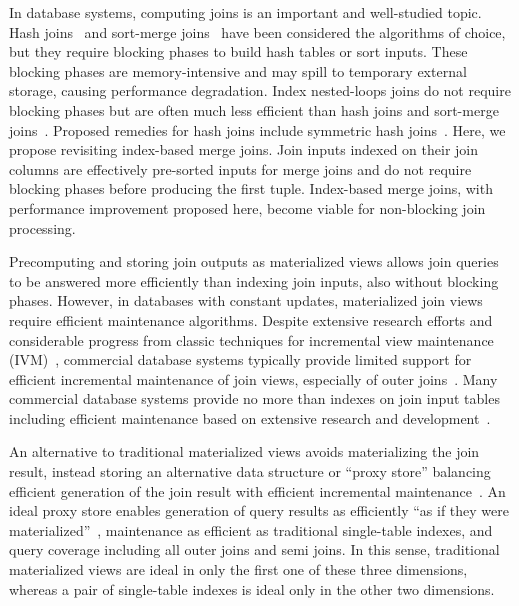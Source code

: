 \documentclass[biblatex, english]{lni}
\begin{document}
In database systems, computing joins is an important and well-studied topic.
Hash joins~\cite{dewitt1985multiprocessor,dewitt1984main,kim1980product} and sort-merge joins~\cite{blasgen1977storage} have been considered the algorithms of choice, but they require blocking phases to build hash tables or sort inputs.
These blocking phases are memory-intensive and may spill to temporary external storage, causing performance degradation.
Index nested-loops joins do not require blocking phases but are often much less efficient than hash joins and sort-merge joins~\cite{Haas1999RippleJoins}.
Proposed remedies for hash joins include symmetric hash joins~\cite{hong1993shj, wilschut1991shj, Urhan2000XJoinAR, lawrence2005early}.
Here, we propose revisiting index-based merge joins.
Join inputs indexed on their join columns are effectively pre-sorted inputs for merge joins and do not require blocking phases before producing the first tuple.
Index-based merge joins, with performance improvement proposed here, become viable for non-blocking join processing.

Precomputing and storing join outputs as materialized views allows join queries to be answered more efficiently than indexing join inputs, also without blocking phases.
However, in databases with constant updates, materialized join views require efficient maintenance algorithms.
Despite extensive research efforts and considerable progress from classic techniques for incremental view maintenance (IVM)~\cite{Idris2017DyanmicYanakakis, GUPTAchangetable, larson2007outerjoin, dbtoasterFK, Blakeley1990PerformanceAnalysis, wilschut1991shj, Urhan2000XJoinAR, hong1993shj}, commercial database systems typically provide limited support for efficient incremental maintenance of join views, especially of outer joins~\cite{oracle2024mvrefresh, postgresql2024incremental, ibm2024mqts,mysql2024viewupdatability, microsoft2024indexedviews, databricks2018stream}.
Many commercial database systems provide no more than indexes on join input tables including efficient maintenance based on extensive research and development~\cite{ibm2024indexsync, microsoft2024modifyindex, oracle2024index}.

An alternative to traditional materialized views avoids materializing the join result, instead storing an alternative data structure or ``proxy store'' balancing efficient generation of the join result with efficient incremental maintenance~\cite{Blakeley1990PerformanceAnalysis, oneil1995joinindex, Idris2017DyanmicYanakakis}.
An ideal proxy store enables generation of query results as efficiently ``as if they were materialized''~\cite{Idris2017DyanmicYanakakis}, maintenance as efficient as traditional single-table indexes, and query coverage including all outer joins and semi joins.
In this sense, traditional materialized views are ideal in only the first one of these three dimensions,
whereas a pair of single-table indexes is ideal only in the other two dimensions.
\end{document}
